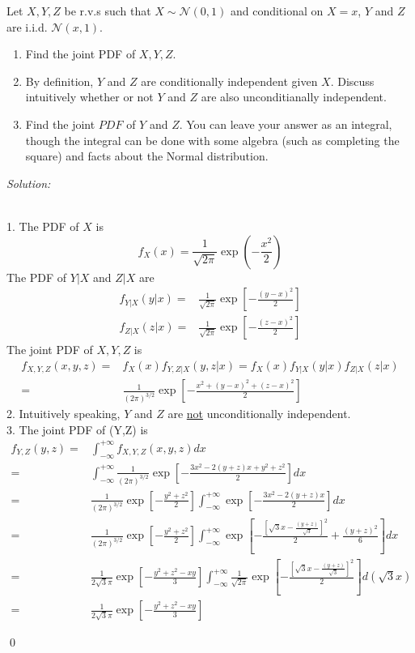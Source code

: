 \documentclass[12pt]{article}
\newenvironment{problem}[2][Problem]{\begin{trivlist}
\item[\hskip \labelsep {\bfseries #1}\hskip \labelsep {\bfseries #2.}]}{\end{trivlist}}
\newenvironment{sol}
    {\emph{Solution:}
    }
    {
    \qed
    }
\begin{document}
\begin{problem}{3}
Let $X,Y,Z$ be r.v.s such that $X\sim \mathcal{N}(0,1)$ and conditional on $X=x$, $Y$ and $Z$ are i.i.d. $\mathcal{N}(x,1)$.
\begin{enumerate}
    \item Find the joint PDF of $X,Y,Z$.
    \item By definition, $Y$ and $Z$ are conditionally independent given $X$. Discuss intuitively whether or not $Y$ and $Z$ are also unconditianally independent.
    \item Find the joint $PDF$ of $Y$ and $Z$. You can leave your answer as an integral, though the integral can be done with some algebra (such as completing the square) and facts about the Normal distribution.
\end{enumerate}
\end{problem}
\begin{sol}
\\1. The PDF of $X$ is
\[
f_X(x)=\frac{1}{\sqrt{2\pi}}\exp(-\frac{x^2}{2})
\]
The PDF of $Y|X$ and $Z|X$ are
\begin{align*}
f_{Y|X}(y|x)=&\frac{1}{\sqrt{2\pi}}\exp[-\frac{(y-x)^2}{2}]\\
f_{Z|X}(z|x)=&\frac{1}{\sqrt{2\pi}}\exp[-\frac{(z-x)^2}{2}]
\end{align*}
The joint PDF of $X,Y,Z$ is
\begin{align*}
f_{X,Y,Z}(x,y,z)=&f_X(x)f_{Y,Z|X}(y,z|x)=f_X(x)f_{Y|X}(y|x)f_{Z|X}(z|x)\\
=&\frac{1}{(2\pi)^{3/2}}\exp[-\frac{x^2+(y-x)^2+(z-x)^2}{2}]
\end{align*}
2. Intuitively speaking, $Y$ and $Z$ are \uline{not} unconditionally independent.\\
3. The joint PDF of (Y,Z) is
\begin{align*}
f_{Y,Z}(y,z)=&\int_{-\infty}^{+\infty}f_{X,Y,Z}(x,y,z)dx\\
=&\int_{-\infty}^{+\infty}\frac{1}{(2\pi)^{3/2}}\exp[-\frac{3x^2-2(y+z)x+y^2+z^2}{2}]dx\\
=&\frac{1}{(2\pi)^{3/2}}\exp[-\frac{y^2+z^2}{2}]\int_{-\infty}^{+\infty}\exp[-\frac{3x^2-2(y+z)x}{2}]dx\\
=&\frac{1}{(2\pi)^{3/2}}\exp[-\frac{y^2+z^2}{2}]\int_{-\infty}^{+\infty}\exp[-\frac{[\sqrt{3}x-\frac{(y+z)}{\sqrt{3}}]^2}{2}+\frac{(y+z)^2}{6}]dx\\
=&\frac{1}{2\sqrt{3}\pi}\exp[-\frac{y^2+z^2-xy}{3}]\int_{-\infty}^{+\infty}\frac{1}{\sqrt{2\pi}}\exp[-\frac{[\sqrt{3}x-\frac{(y+z)}{\sqrt{3}}]^2}{2}]d(\sqrt{3}x)\\
=&\frac{1}{2\sqrt{3}\pi}\exp[-\frac{y^2+z^2-xy}{3}]
\end{align*}
\end{sol}
\end{document}
